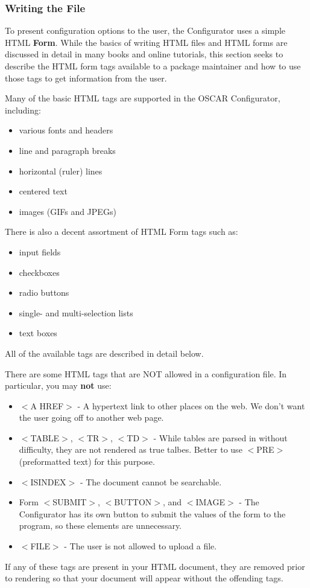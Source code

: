 \subsubsection*{Writing the  File}

To present configuration options to the user, the Configurator uses
a simple HTML \textbf{Form}. While the basics of writing HTML files
and HTML forms are discussed in detail in many books and online tutorials,
this section seeks to describe the HTML form tags available to a package
maintainer and how to use those tags to get information from the user.

Many of the basic HTML tags are supported in the OSCAR Configurator,
including:

\begin{itemize}
\item various fonts and headers 
\item line and paragraph breaks 
\item horizontal (ruler) lines 
\item centered text 
\item images (GIFs and JPEGs) 
\end{itemize}
There is also a decent assortment of HTML Form tags such as:

\begin{itemize}
\item input fields
\item checkboxes
\item radio buttons
\item single- and multi-selection lists
\item text boxes 
\end{itemize}
All of the available tags are described in detail below.

There are some HTML tags that are NOT allowed in a configuration file.
In particular, you may \textbf{not} use:

\begin{itemize}
\item $<$A HREF$>$ - A hypertext link to other places on the web. We don't want
the user going off to another web page.
\item $<$TABLE$>$, $<$TR$>$, $<$TD$>$ - While tables are parsed in without difficulty,
they are not rendered as true talbes. Better to use $<$PRE$>$ (preformatted
text) for this purpose.
\item $<$ISINDEX$>$ - The document cannot be searchable.
\item Form $<$SUBMIT$>$, $<$BUTTON$>$, and $<$IMAGE$>$ - The Configurator has its own
button to submit the values of the form to the program, so these elements
are unnecessary.
\item $<$FILE$>$ - The user is not allowed to upload a file. 
\end{itemize}
If any of these tags are present in your HTML document, they are removed
prior to rendering so that your document will appear without the offending
tags.



